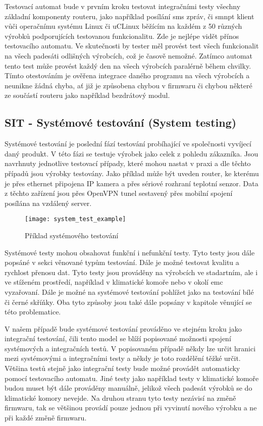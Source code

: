Testovací automat bude v prvním kroku testovat integračními testy všechny základní komponenty routeru, jako například posílání sms zpráv, či smnpt klient vůči operačnímu systému Linux či uCLinux běžícím na každém z 50 různých výrobků podporujících testovanou funkcionalitu. Zde je nejlépe vidět přínos testovacího automatu. Ve skutečnosti by tester měl provést test všech funkcionalit na všech padesáti odlišných výrobcích, což je časově nemožné. Zatímco automat tento test může provést každý den na všech výrobcích paralérně během chvilky. Tímto otestováním je ověřena integrace daného programu na všech výrobcích a neunikne žádná chyba, ať již je způsobena chybou v firmwaru či chybou některé ze součástí routeru jako například bezdrátový modul.

\subsection{SIT - Systémové testování (System testing)}
Systémové testování je poslední fází testování probíhající ve společnosti vyvíjecí daný produkt. V této fázi se testuje výrobek jako celek z pohledu zákazníka. Jsou navrhnuty jednotlive testovací případy, které mohou nastat v praxi a dle těchto případů jsou výrobky testovány. Jako příklad může být uveden router, ke kterému je přes ethernet připojena IP kamera a přes sériové rozhraní teplotní senzor. Data z těchto zařízení jsou přes OpenVPN tunel sestavený přes mobilní spojení posílána na vzdálený server.

\begin{figure}[h]
  \centering
  \texttt{[image: system\_test\_example]}
  \caption{Příklad systémového testování}
  \label{fig:system_test_example}
\end{figure}

Systémové testy mohou obsahovat funkční i nefunkční testy. Tyto testy jsou dále popsáné v sekci věnované typům testování. Dále je možné testovat kvalitu a rychlost přenosu dat. Tyto testy jsou prováděny na výrobcích ve stadartním, ale i ve stíženém prostředí, například v klimatické komoře nebo v okolí emc vyzařovaní. Dále je možné na systémové testování pohlížet jako na testování bílé či černé skříňky. Oba tyto způsoby jsou také dále popsány v kapitole věnující se této problematice.

V našem případě bude systémové testování prováděno ve stejném kroku jako integrační testování, čili tento model se blíží popisované možnosti spojení systémových a integračních testů. V popisovaném případě někdy lze určit hranici mezi systémovými a integračními testy a někdy je toto rozdělění těžké určit. Většina testů stejně jako integrační testy bude možné provádět automaticky pomocí testovacího automatu. Jiné testy jako například testy v klimatické komoře budou muset být dále prováděny manuálně, jelikož všech padesát výrobků se do klimatické komory nevejde. Na druhou stranu tyto testy nezávisí na změně firmwaru, tak se většinou provádí pouze jednou při vyvinutí nového výrobku a ne při každé změně firmwaru.

